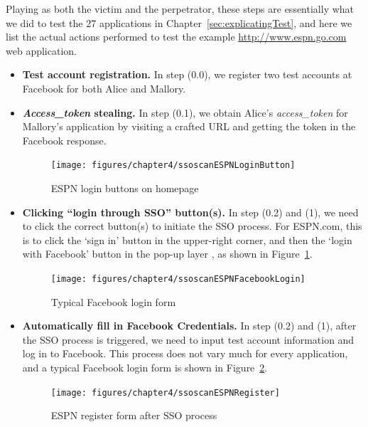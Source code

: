 Playing as both the victim and the perpetrator, these steps are essentially what we did to test the 27 applications in Chapter~\ref{sec:explicatingTest}, and here we list the actual actions performed to test the example \url{http://www.espn.go.com} web application.  

\begin{itemize}

\item \textbf{Test account registration.}  In step (0.0), we register two test accounts at Facebook for both Alice and Mallory.

\item \textbf{\emph{Access\_token} stealing.}  In step (0.1), we obtain Alice's \emph{access\_token} for Mallory's application by visiting a crafted URL and getting the token in the Facebook response.

\begin{figure}[hbt]
\centering
\texttt{[image: figures/chapter4/ssoscanESPNLoginButton]}
\caption{ESPN login buttons on homepage}
\label{fig:ssoscanESPNLoginButton}
\end{figure}

\item \textbf{Clicking ``login through SSO'' button(s).}  In step (0.2) and (1), we need to click the correct button(s) to initiate the SSO process.  For ESPN.com, this is to click the `sign in' button in the upper-right corner, and then the `login with Facebook' button in the pop-up layer , as shown in Figure~\ref{fig:ssoscanESPNLoginButton}.

\begin{figure}[bht]
\centering
\texttt{[image: figures/chapter4/ssoscanESPNFacebookLogin]}
\caption{Typical Facebook login form}
\label{fig:ssoscanESPNFacebookLogin}
\end{figure}

\item \textbf{Automatically fill in Facebook Credentials.}  In step (0.2) and (1), after the SSO process is triggered, we need to input test account information and log in to Facebook.  This process does not vary much for every application, and a typical Facebook login form is shown in Figure~\ref{fig:ssoscanESPNFacebookLogin}.

\begin{figure}[hbt]
\centering
\texttt{[image: figures/chapter4/ssoscanESPNRegister]}
\caption{ESPN register form after SSO process}
\label{fig:ssoscanESPNRegister}
\end{figure}


\end{itemize}
